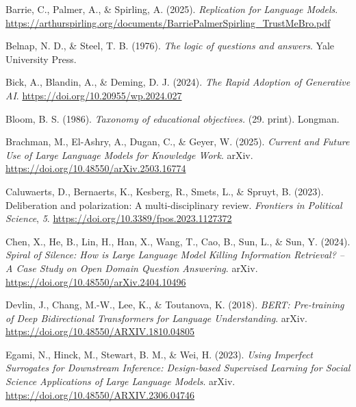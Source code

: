 \documentclass[
  12pt,
]{article}
\newlength{\cslhangindent}
\newenvironment{CSLReferences}[2] %
 {\begin{list}{}{%
  \setlength{\itemindent}{0pt}
  \setlength{\leftmargin}{0pt}
  \setlength{\parsep}{0pt}
  \ifodd #1
   \setlength{\leftmargin}{\cslhangindent}
   \setlength{\itemindent}{-1\cslhangindent}
  \fi
  \setlength{\itemsep}{#2\baselineskip}}}
 {\end{list}}
\begin{document}
\label{refs}
\begin{CSLReferences}{1}{0}
Barrie, C., Palmer, A., \& Spirling, A. (2025). \emph{Replication for {Language} {Models}}. \url{https://arthurspirling.org/documents/BarriePalmerSpirling_TrustMeBro.pdf}

Belnap, N. D., \& Steel, T. B. (1976). \emph{The logic of questions and answers}. Yale University Press.

Bick, A., Blandin, A., \& Deming, D. J. (2024). \emph{The {Rapid} {Adoption} of {Generative} {AI}}. \url{https://doi.org/10.20955/wp.2024.027}

Bloom, B. S. (1986). \emph{Taxonomy of educational objectives.} (29. print). Longman.

Brachman, M., El-Ashry, A., Dugan, C., \& Geyer, W. (2025). \emph{Current and {Future} {Use} of {Large} {Language} {Models} for {Knowledge} {Work}}. arXiv. \url{https://doi.org/10.48550/arXiv.2503.16774}

Caluwaerts, D., Bernaerts, K., Kesberg, R., Smets, L., \& Spruyt, B. (2023). Deliberation and polarization: A multi-disciplinary review. \emph{Frontiers in Political Science}, \emph{5}. \url{https://doi.org/10.3389/fpos.2023.1127372}

Chen, X., He, B., Lin, H., Han, X., Wang, T., Cao, B., Sun, L., \& Sun, Y. (2024). \emph{Spiral of {Silence}: {How} is {Large} {Language} {Model} {Killing} {Information} {Retrieval}? -- {A} {Case} {Study} on {Open} {Domain} {Question} {Answering}}. arXiv. \url{https://doi.org/10.48550/arXiv.2404.10496}

Devlin, J., Chang, M.-W., Lee, K., \& Toutanova, K. (2018). \emph{{BERT}: {Pre}-training of {Deep} {Bidirectional} {Transformers} for {Language} {Understanding}}. arXiv. \url{https://doi.org/10.48550/ARXIV.1810.04805}

Egami, N., Hinck, M., Stewart, B. M., \& Wei, H. (2023). \emph{Using {Imperfect} {Surrogates} for {Downstream} {Inference}: {Design}-based {Supervised} {Learning} for {Social} {Science} {Applications} of {Large} {Language} {Models}}. arXiv. \url{https://doi.org/10.48550/ARXIV.2306.04746}


\end{CSLReferences}
\end{document}
